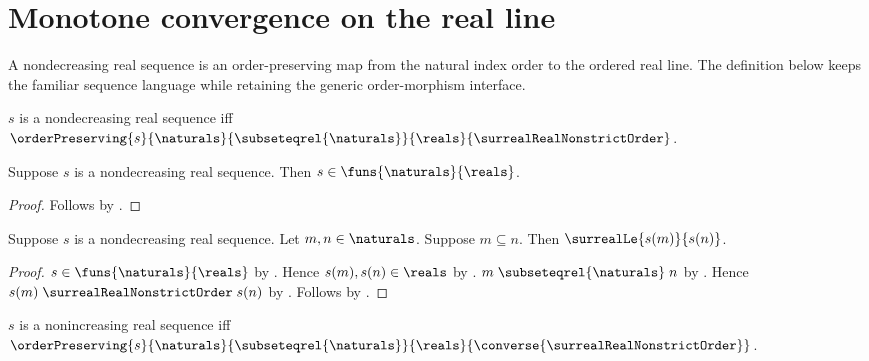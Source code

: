 \section{Monotone convergence on the real line}







A nondecreasing real sequence is an order-preserving map from the natural
index order to the ordered real line.  The definition below keeps the
familiar sequence language while retaining the generic order-morphism
interface.

\begin{definition}\label{nondecreasing_real_sequence}
    $s$ is a nondecreasing real sequence iff
        $\orderPreserving{s}{\naturals}{\subseteqrel{\naturals}}
            {\reals}{\surrealRealNonstrictOrder}$.
\end{definition}

\begin{proposition}\label{nondecreasing_real_sequence_type}
    Suppose $s$ is a nondecreasing real sequence.
    Then $s\in\funs{\naturals}{\reals}$.
\end{proposition}
\begin{proof}
    Follows by
        .
\end{proof}

\begin{proposition}\label{nondecreasing_real_sequence_mono}
    Suppose $s$ is a nondecreasing real sequence.
    Let $m,n\in\naturals$.
    Suppose $m\subseteq n$.
    Then $\surrealLe{s(m)}{s(n)}$.
\end{proposition}
\begin{proof}
    $s\in\funs{\naturals}{\reals}$ by
        .
    Hence $s(m),s(n)\in\reals$ by .
    $m\mathrel{\subseteqrel{\naturals}}n$ by .
    Hence $s(m)\mathrel{\surrealRealNonstrictOrder}s(n)$ by
        .
    Follows by .
\end{proof}

\begin{definition}\label{nonincreasing_real_sequence}
    $s$ is a nonincreasing real sequence iff
        $\orderPreserving{s}{\naturals}{\subseteqrel{\naturals}}
            {\reals}{\converse{\surrealRealNonstrictOrder}}$.
\end{definition}

